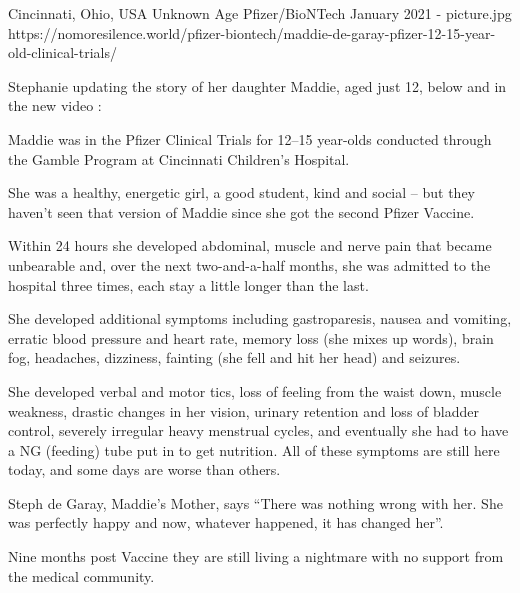 {Cincinnati, Ohio, USA}
{Unknown Age}
{Pfizer/BioNTech}
{January 2021}
{-}
{picture.jpg}
{https://nomoresilence.world/pfizer-biontech/maddie-de-garay-pfizer-12-15-year-old-clinical-trials/}
{


Stephanie updating the story of her daughter Maddie, aged just 12, below and in the new video :

Maddie was in the Pfizer Clinical Trials for 12–15 year-olds conducted through the Gamble Program at Cincinnati Children’s Hospital.

She was a healthy, energetic girl, a good student, kind and social – but they haven’t seen that version of Maddie since she got the second Pfizer Vaccine.

Within 24 hours she developed abdominal, muscle and nerve pain that became unbearable and, over the next two-and-a-half months, she was admitted to the hospital three times, each stay a little longer than the last.

She developed additional symptoms including gastroparesis, nausea and vomiting, erratic blood pressure and heart rate, memory loss (she mixes up words), brain fog, headaches, dizziness, fainting (she fell and hit her head) and seizures.

She developed verbal and motor tics, loss of feeling from the waist down, muscle weakness, drastic changes in her vision, urinary retention and loss of bladder control, severely irregular heavy menstrual cycles, and eventually she had to have a NG (feeding) tube put in to get nutrition. All of these symptoms are still here today, and some days are worse than others.

Steph de Garay, Maddie’s Mother, says “There was nothing wrong with her. She was perfectly happy and now, whatever happened, it has changed her”.

Nine months post Vaccine they are still living a nightmare with no support from the medical community.
}
